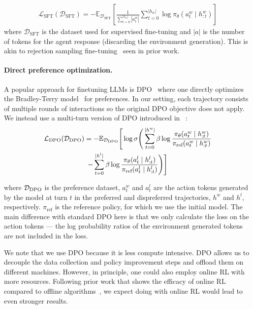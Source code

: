 \begin{align}
    \mathcal{L}_\text{SFT}(\mathcal{D}_\text{SFT}) = -\mathbb{E}_{\mathcal{D}_\text{SFT}} \left[ \frac{1}{\sum_{t=0}^{|h_w|}|a_t^w|}\sum_{t=0}^{|h_w|} \log \pi_\theta \left(a^w_t \mid h^w_{:t}\right) \right]
\end{align}
where $\mathcal{D}_\text{SFT}$ is the dataset used for supervised fine-tuning and $|a|$ is the number of tokens for the agent response (discarding the environment generation). This is akin to rejection sampling fine-tuning~\citep{gulcehre2023reinforcedselftrainingrestlanguage,dong2023raft,mukobi2023superhfsupervisediterativelearning} seen in prior work.

\paragraph{Direct preference optimization.} A popular approach for finetuning LLMs is DPO~\citep{rafailov2024direct} where one directly optimizes the Bradley-Terry model~\citep{bradley1952rank} for preferences. In our setting, each trajectory consists of multiple rounds of interactions so the original DPO objective does not apply. We instead use a multi-turn version of DPO introduced in ~\citet{rafailov2024rqlanguagemodel}:
\begin{multline}
    \mathcal{L}_\text{DPO}({\mathcal{D}}_\text{DPO}) = -\mathbb{E}_{{\mathcal{D}}_\text{DPO}}\Bigg[\log \sigma\Bigg( 
    \sum_{t=0}^{|h^w|}\beta \log\frac{\pi_\theta(a_t^w \mid h_{:t}^w)}{\pi_\text{ref}(a_t^w \mid h_{:t}^w)} \\
    - \sum_{t=0}^{|h^l|}\beta \log\frac{\pi_\theta(a_t^l \mid h_{:t}^l)}{\pi_\text{ref}(a_t^l \mid h_{:t}^l)}
    \Bigg)\Bigg]
\end{multline}

where ${\mathcal{D}}_\text{DPO}$ is the preference dataset, $a_t^w$ and $a_t^l$ are the action tokens generated by the model at turn $t$ in the preferred and dispreferred trajectories, $h^w$ and $h^l$, respectively.
$\pi_\text{ref}$ is the reference policy, for which we use the initial model.
The main difference with standard DPO here is that we only calculate the loss on the action tokens --- the log probability ratios of the environment generated tokens are not included in the loss.

We note that we use DPO because it is less compute intensive. DPO allows us to decouple the data collection and policy improvement steps and offload them on different machines. However, in principle, one could also employ online RL with more resources. Following prior work that shows the efficacy of online RL compared to offline algorithms~\citep{xu2024dposuperiorppollm,tajwar2024preferencefinetuningllmsleverage}, we expect doing \ours{} with online RL would lead to even stronger results.


